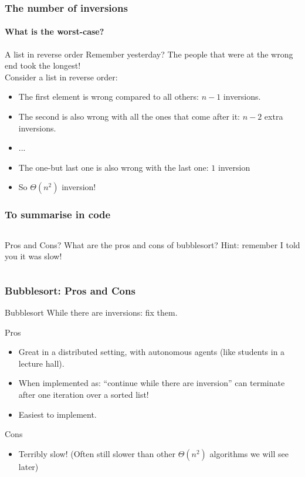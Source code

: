 \begin{frame}
	\frametitle{The number of inversions}
	\framesubtitle{What is the worst-case?}

	\begin{answerblock}{A list in reverse order}
		Remember yesterday? The people that were at the wrong end took the longest!\\
		\pause
		Consider a list in reverse order:
		\begin{itemize}
			\item The first element is wrong compared to all others: $n-1$ inversions.
		\pause
			\item The second is also wrong with all the ones that come after it: $n-2$ extra inversions.
			\item ...
		\pause
			\item The one-but last one is also wrong with the last one: $1$ inversion
		\pause
			\item So $\Theta(n^2)$ inversion!
		\end{itemize}
	\end{answerblock}
\end{frame}

\begin{frame}
	\frametitle{To summarise in code}
	\begin{columns}
	
		\begin{questionblock}{Pros and Cons?}
			What are the pros and cons of bubblesort? Hint: remember I told you it was slow!
		\end{questionblock}
	\end{columns}
\end{frame}

\begin{frame}
	\frametitle{Bubblesort: Pros and Cons}

		\begin{block}{Bubblesort}
			While there are inversions: fix them.
		\end{block}	
		\begin{exampleblock}{Pros}
			\begin{itemize}
				\item Great in a distributed setting, with autonomous agents (like students in a lecture hall).
				\item When implemented as: ``continue while there are inversion'' can terminate after one iteration over a
					sorted list! 
				\item Easiest to implement.
			\end{itemize}
		\end{exampleblock}	
		\begin{alertblock}{Cons}
			\begin{itemize}
				\item Terribly slow! (Often still slower than other $\Theta(n^2)$ algorithms we will see later)
			\end{itemize}
		\end{alertblock}	
\end{frame}
